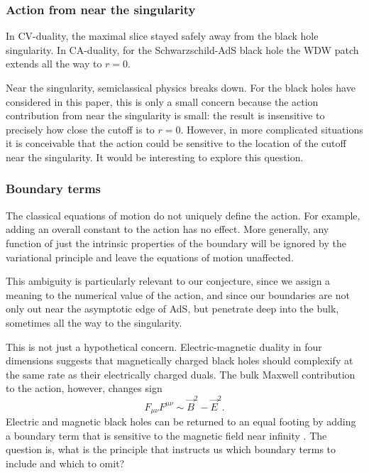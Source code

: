 \documentclass[12pt]{article}
\numberwithin{equation}{section}
\begin{document}
\subsubsection{Action from near the singularity}
In  CV-duality, the maximal slice stayed safely away from the black hole singularity. In  CA-duality, for the Schwarzschild-AdS black hole the WDW patch extends all the way to $r=0$.

Near the singularity, semiclassical physics breaks down. For the black holes have considered in this paper, this is only a small concern because the action contribution from near the singularity is small: the result is insensitive to precisely how close the cutoff is to $r=0$. However, in more complicated situations it is conceivable that the action could be sensitive to the location of the cutoff near the singularity. It would be interesting to explore this question.



\subsubsection{Boundary terms}
The classical equations of motion do not uniquely define the action. For example, adding an overall constant to the action has no effect. More generally, any function of just the intrinsic properties of the boundary will be ignored by the variational principle and leave the equations of motion unaffected.

This ambiguity is particularly relevant to our conjecture, since we assign a meaning to the numerical value of the action, and since our boundaries are not only out near the asymptotic edge of AdS, but penetrate deep into the bulk, sometimes all the way to the singularity.

This is not just a hypothetical concern. Electric-magnetic duality in four dimensions suggests that magnetically charged black holes should complexify at the same rate as their electrically charged duals. The bulk Maxwell contribution to the action, however, changes sign
\begin{equation}
F_{\mu \nu} F^{\mu \nu} \sim  \vec{B}^2 -\vec{E}^2.
\end{equation}
Electric and magnetic black holes can be returned to an equal footing by adding a boundary term that is sensitive to the magnetic field near infinity \cite{Braden:1990hw,Hawking:1995ap}. The question is, what is the principle that instructs us which boundary terms to include and which to omit?
\end{document}
